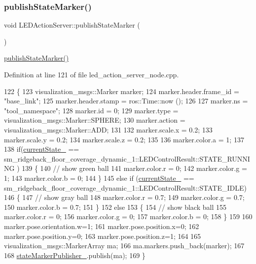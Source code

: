 \subsubsection{\texorpdfstring{publish\+State\+Marker()}{publishStateMarker()}\hspace{0.1cm}{\footnotesize\ttfamily [4/4]}}
{\footnotesize\ttfamily void L\+E\+D\+Action\+Server\+::publish\+State\+Marker (\begin{DoxyParamCaption}{ }\end{DoxyParamCaption})\hspace{0.3cm}{\ttfamily [inline]}}

\hyperlink{classLEDActionServer_a73bb754ac2347c50660624ad92315895}{publish\+State\+Marker()} 

Definition at line 121 of file led\+\_\+action\+\_\+server\+\_\+node.\+cpp.


\begin{DoxyCode}
122 \{
123     visualization\_msgs::Marker marker;
124     marker.header.frame\_id = \textcolor{stringliteral}{"base\_link"};
125     marker.header.stamp = ros::Time::now ();
126 
127     marker.ns = \textcolor{stringliteral}{"tool\_namespace"};
128     marker.id = 0;
129     marker.type = visualization\_msgs::Marker::SPHERE;
130     marker.action = visualization\_msgs::Marker::ADD;
131     
132     marker.scale.x = 0.2;
133     marker.scale.y = 0.2;
134     marker.scale.z = 0.2;
135 
136     marker.color.a = 1;
137 
138     \textcolor{keywordflow}{if}(\hyperlink{classLEDActionServer_a1dc456e987dc331501ad6ff2215661ff}{currentState\_} == sm\_ridgeback\_floor\_coverage\_dynamic\_1::LEDControlResult::STATE\_RUNNING
      )
139     \{
140       \textcolor{comment}{// show green ball}
141       marker.color.r = 0;
142       marker.color.g = 1;
143       marker.color.b = 0;
144     \}
145     \textcolor{keywordflow}{else} \textcolor{keywordflow}{if} (\hyperlink{classLEDActionServer_a1dc456e987dc331501ad6ff2215661ff}{currentState\_} == 
      sm\_ridgeback\_floor\_coverage\_dynamic\_1::LEDControlResult::STATE\_IDLE)
146     \{
147       \textcolor{comment}{// show gray ball}
148       marker.color.r = 0.7;
149       marker.color.g = 0.7;
150       marker.color.b = 0.7;
151     \}
152     \textcolor{keywordflow}{else}
153     \{
154       \textcolor{comment}{// show black ball}
155       marker.color.r = 0;
156       marker.color.g = 0;
157       marker.color.b = 0;
158     \}
159 
160     marker.pose.orientation.w=1;
161     marker.pose.position.x=0;
162     marker.pose.position.y=0;
163     marker.pose.position.z=1;
164 
165     visualization\_msgs::MarkerArray ma;
166     ma.markers.push\_back(marker);
167 
168     \hyperlink{classLEDActionServer_a4168a1e4a17eb1d65aaa059ce0c52086}{stateMarkerPublisher\_}.publish(ma);
169 \}
\end{DoxyCode}
\mbox{\label{classLEDActionServer_ae8e1b2d4bf0a85eec3ffd1c7d4f08490}} 

